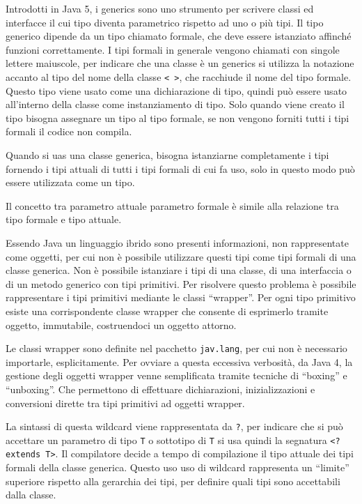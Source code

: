 \documentclass{article}
\numberwithin{equation}{subsection}
\begin{document}
Introdotti in Java 5, i generics sono uno strumento per scrivere classi ed interfacce il cui tipo diventa parametrico rispetto ad uno o più tipi. Il tipo generico dipende 
da un tipo chiamato formale, che deve essere istanziato affinché funzioni correttamente. I tipi formali in generale vengono chiamati con singole lettere maiuscole, 
per indicare che una classe è un generics si utilizza la notazione accanto al tipo del nome della classe \verb|< >|, che racchiude il nome del tipo formale. 
Questo tipo viene usato come una dichiarazione di tipo, quindi può essere usato all'interno della classe come instanziamento di tipo. Solo quando viene creato il tipo 
bisogna assegnare un tipo al tipo formale, se non vengono forniti tutti i tipi formali il codice non compila. 

Quando si uas una classe generica, bisogna istanziarne completamente i tipi fornendo i tipi attuali di tutti i tipi formali di cui fa uso, solo in questo modo può essere 
utilizzata come un tipo. 

Il concetto tra parametro attuale parametro formale è simile alla relazione tra tipo formale e tipo attuale. 

Essendo Java un linguaggio ibrido sono presenti informazioni, non rappresentate come oggetti, per cui non è possibile utilizzare questi tipi come tipi formali di una classe 
generica. Non è possibile istanziare i tipi di una classe, di una interfaccia o di un metodo generico con tipi primitivi. Per risolvere questo problema è possibile 
rappresentare i tipi primitivi mediante le classi ``wrapper''. Per ogni tipo primitivo esiste una corrispondente classe wrapper che consente di esprimerlo tramite oggetto, 
immutabile, costruendoci un oggetto attorno. 

Le classi wrapper sono definite nel pacchetto \verb|jav.lang|, per cui non è necessario importarle, esplicitamente. Per ovviare a questa eccessiva verbosità, da 
Java 4, la gestione degli oggetti wrapper venne semplificata tramite tecniche di ``boxing'' e ``unboxing''. Che permettono di effettuare dichiarazioni, inizializzazioni e 
conversioni dirette tra tipi primitivi ad oggetti wrapper. 




La sintassi di questa wildcard viene rappresentata da \verb|?|, per indicare che si può accettare un parametro di tipo \verb|T| o sottotipo di \verb|T| si usa quindi la 
segnatura \verb|<? extends T>|. 
Il compilatore decide a tempo di compilazione il tipo attuale dei tipi formali della classe generica. Questo uso uso di wildcard rappresenta un ``limite'' superiore 
rispetto alla gerarchia dei tipi, per definire quali tipi sono accettabili dalla classe. 
\end{document}

